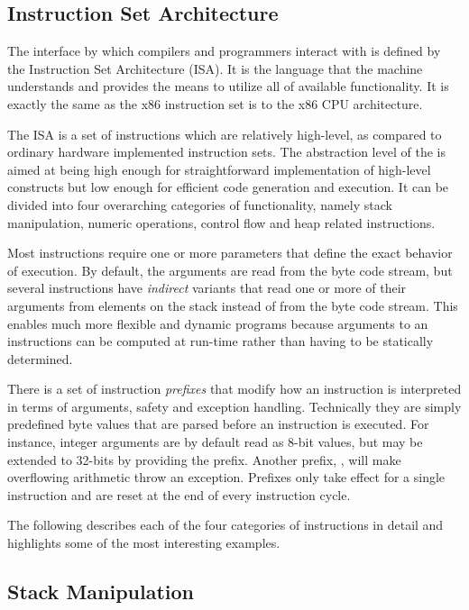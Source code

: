 \subsection{Instruction Set Architecture}
\label{sec:design:isa}

The interface by which compilers and programmers interact with \thename{} is
defined by the Instruction Set Architecture (ISA). It is the language that the
machine understands and provides the means to utilize all of available
functionality. It is exactly the same as the x86 instruction set is to the x86
CPU architecture.

The \thename{} ISA is a set of instructions which are relatively high-level, as
compared to ordinary hardware implemented instruction sets. The abstraction
level of the \thename{} is aimed at being high enough for straightforward
implementation of high-level constructs but low enough for efficient code
generation and execution. It can be divided into four overarching categories of
functionality, namely stack manipulation, numeric operations, control flow and
heap related instructions.

Most instructions require one or more parameters that define the exact behavior
of execution. By default, the arguments are read from the byte code stream, but
several instructions have \emph{indirect} variants that read one or more of
their arguments from elements on the stack instead of from the byte code
stream. This enables much more flexible and dynamic programs because arguments
to an instructions can be computed at run-time rather than having to be
statically determined.

There is a set of instruction \emph{prefixes} that modify how an instruction is
interpreted in terms of arguments, safety and exception handling. Technically
they are simply predefined byte values that are parsed before an instruction is
executed. For instance, integer arguments are by default read as 8-bit values,
but may be extended to 32-bits by providing the  prefix. Another
prefix, , will make overflowing arithmetic throw an
exception. Prefixes only take effect for a single instruction and are reset at
the end of every instruction cycle.

The following describes each of the four categories of instructions in detail
and highlights some of the most interesting examples.

\subsection{Stack Manipulation}

